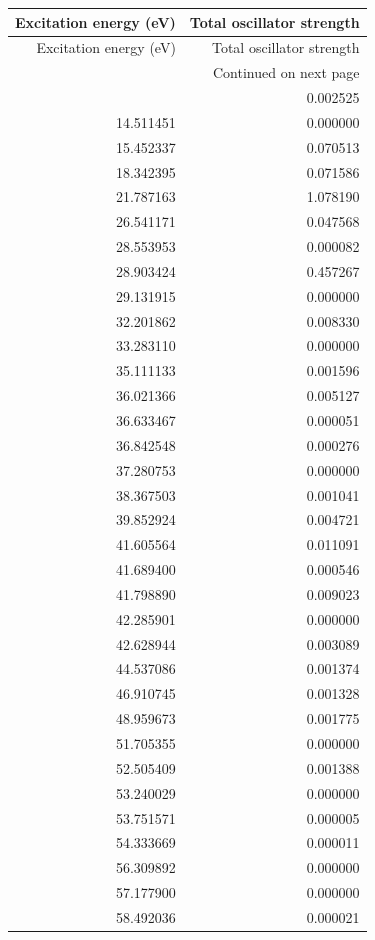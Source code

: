 \begin{longtable}{rr}
\toprule
Excitation energy (eV) & Total oscillator strength \\
\midrule
\endfirsthead
\toprule
Excitation energy (eV) & Total oscillator strength \\
\midrule
\endhead
\midrule
\multicolumn{2}{r}{Continued on next page} \\
\midrule
\endfoot
\bottomrule
\endlastfoot
11.669712 & 0.002525 \\
14.511451 & 0.000000 \\
15.452337 & 0.070513 \\
18.342395 & 0.071586 \\
21.787163 & 1.078190 \\
26.541171 & 0.047568 \\
28.553953 & 0.000082 \\
28.903424 & 0.457267 \\
29.131915 & 0.000000 \\
32.201862 & 0.008330 \\
33.283110 & 0.000000 \\
35.111133 & 0.001596 \\
36.021366 & 0.005127 \\
36.633467 & 0.000051 \\
36.842548 & 0.000276 \\
37.280753 & 0.000000 \\
38.367503 & 0.001041 \\
39.852924 & 0.004721 \\
41.605564 & 0.011091 \\
41.689400 & 0.000546 \\
41.798890 & 0.009023 \\
42.285901 & 0.000000 \\
42.628944 & 0.003089 \\
44.537086 & 0.001374 \\
46.910745 & 0.001328 \\
48.959673 & 0.001775 \\
51.705355 & 0.000000 \\
52.505409 & 0.001388 \\
53.240029 & 0.000000 \\
53.751571 & 0.000005 \\
54.333669 & 0.000011 \\
56.309892 & 0.000000 \\
57.177900 & 0.000000 \\
58.492036 & 0.000021 \\

\end{longtable}
